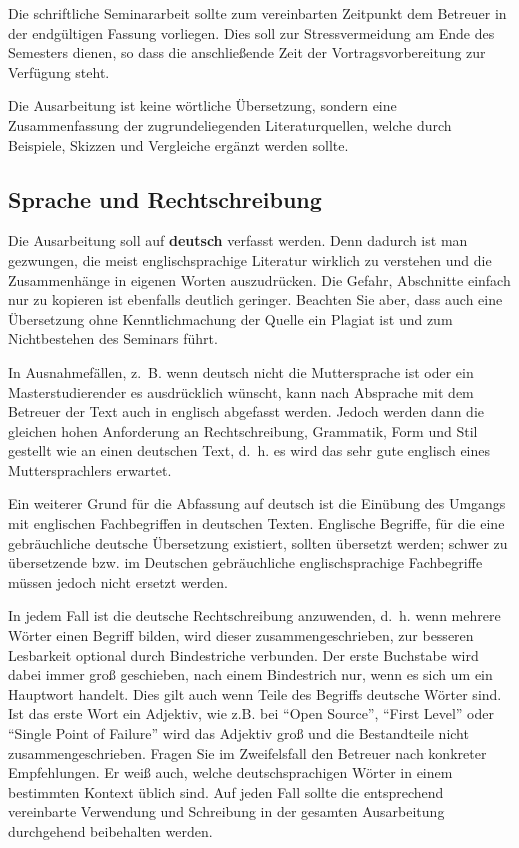 \documentclass[final,bibliography=totocnumbered]{include/sikseminar}
\begin{document}
Die schriftliche Seminararbeit sollte zum vereinbarten Zeitpunkt dem Betreuer in der endgültigen Fassung vorliegen. Dies soll zur Stressvermeidung am Ende des Semesters dienen, so dass die anschließende Zeit der Vortragsvorbereitung zur Verfügung steht.

Die Ausarbeitung ist keine wörtliche Übersetzung, sondern eine Zusammenfassung der zugrundeliegenden Literaturquellen, welche durch Beispiele, Skizzen und Vergleiche ergänzt werden sollte.



\subsection{Sprache und Rechtschreibung}
Die Ausarbeitung soll auf \textbf{deutsch} verfasst werden. Denn dadurch ist man gezwungen, die meist englischsprachige Literatur wirklich zu verstehen und die Zusammenhänge in eigenen Worten auszudrücken. Die Gefahr, Abschnitte einfach nur zu kopieren ist ebenfalls deutlich geringer. Beachten Sie aber, dass auch eine Übersetzung ohne Kenntlichmachung der Quelle ein Plagiat ist und zum Nichtbestehen des Seminars führt.

In Ausnahmefällen, z.~B. wenn deutsch nicht die Muttersprache ist oder ein Masterstudierender es ausdrücklich wünscht, kann nach Absprache mit dem Betreuer der Text auch in englisch abgefasst werden. Jedoch werden dann die gleichen hohen Anforderung an Rechtschreibung, Grammatik, Form und Stil gestellt wie an einen deutschen Text, d.~h. es wird das sehr gute englisch eines Muttersprachlers erwartet.

Ein weiterer Grund für die Abfassung auf deutsch ist die Einübung des Umgangs mit englischen Fachbegriffen in deutschen Texten. Englische Begriffe, für die eine gebräuchliche deutsche Übersetzung existiert, sollten übersetzt werden; schwer zu übersetzende bzw. im Deutschen gebräuchliche englischsprachige Fachbegriffe müssen jedoch nicht ersetzt werden. 

In jedem Fall ist die deutsche Rechtschreibung anzuwenden, d.~h. wenn mehrere Wörter einen Begriff bilden, wird dieser zusammengeschrieben, zur besseren Lesbarkeit optional durch Bindestriche verbunden. Der erste Buchstabe wird dabei immer groß geschieben, nach einem Bindestrich nur, wenn es sich um ein Hauptwort handelt. Dies gilt auch wenn Teile des Begriffs deutsche Wörter sind. Ist das erste Wort ein Adjektiv, wie z.B. bei ``Open Source'', ``First Level'' oder ``Single Point of Failure'' wird das Adjektiv groß und die Bestandteile nicht zusammengeschrieben. Fragen Sie im Zweifelsfall den Betreuer nach konkreter Empfehlungen. Er weiß auch, welche deutschsprachigen Wörter in einem bestimmten Kontext üblich sind. Auf jeden Fall sollte die entsprechend vereinbarte Verwendung und Schreibung in der gesamten Ausarbeitung durchgehend beibehalten werden.
\end{document}
